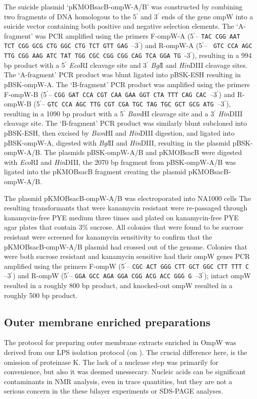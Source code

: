 The suicide plasmid `pKMOBsacB-ompW-A/B' was constructed by combining two fragments of DNA homologous to the 5$^\prime$ and 3$^\prime$ ends of the gene ompW into a suicide vector containing both positive and negative selection elements. The `A-fragment' was \ac{PCR} amplified using the primers F-ompW-A (5$^\prime$\!-- \texttt{TAC CGG AAT TCT CGG GCG CTG GGC CTG TCT GTT GAG }--3$^\prime$) and R-ompW-A (5$^\prime$\!-- \texttt{ GTC CCA AGC TTG CGG AAG ATC TAT TGG CGC CGG CGG CAG TCA GGA TG }-3$^\prime$), resulting in a 994 bp product with a 5$^\prime$ \textit{Eco}RI cleavage site and  3$^\prime$ \textit{Bgl}I and \textit{Hin}DIII cleavage sites.  The `A-fragment' \ac{PCR} product was blunt ligated into pBSK-ESH resulting in pBSK-ompW-A. The `B-fragment' PCR product was amplified using the primers F-ompW-B (5$^\prime$\!-- \texttt{CGG GAT CCA CGT CAA GAA GGT CTA TTT CAG CAC }--3$^\prime$) and R-ompW-B (5$^\prime$\!-- \texttt{GTC CCA AGC TTG CGT CGA TGC TAG TGC GCT GCG ATG }--3$^\prime$), resulting in a 1090 bp product with a 5$^\prime$ \textit{Bam}HI cleavage site and a 3$^\prime$ \textit{Hin}DIII cleavage site. The `B-fragment' \ac{PCR} product was similarly blunt subcloned into pBSK-ESH, then excised by \textit{Bam}HI and \textit{Hin}DIII digestion, and ligated into pBSK-ompW-A, digested with \textit{Bgl}II and \textit{Hin}DIII, resulting in the plasmid pBSK-ompW-A/B. The plasmids pBSK-ompW-A/B and pKMOBsacB were digested with \textit{Eco}RI and \textit{Hin}DIII, the 2070 bp fragment from pBSK-ompW-A/B was ligated into the pKMOBsacB fragment creating the plasmid pKMOBsacB-ompW-A/B.

The plasmid pKMOBsacB-ompW-A/B was electroporated into \caulobacter NA1000
cells The resulting transformants that
were kanamycin resistant were re-passaged through kanamycin-free \ac{PYE} medium
three times and plated on kanamycin-free \ac{PYE} agar plates that contain 3\%
sucrose. All colonies that were found to be sucrose resistant were screened for
kanamycin sensitivity to confirm that the pKMOBsacB-ompW-A/B plasmid had crossed
out of the genome. Colonies that were both sucrose resistant and kanamycin
sensitive had their ompW genes \ac{PCR} amplified using the primers F-ompW
(5$^\prime$\!-- \texttt{CGC ACT GGG CTT GCT GGC CTT TTT C }--3$^\prime$) and
R-ompW (5$^\prime$\!-- \texttt{GGA GCC AGA GGA CGG ACG ACC GGG G }--3$^\prime$); intact ompW resulted in a roughly 800 bp product, and knocked-out ompW resulted in a roughly 500 bp product.


\subsection{Outer membrane enriched preparations}
\label{sub:porin_omp_prep}
The protocol for preparing outer membrane extracts enriched in OmpW was derived from our \ac{LPS} isolation protocol (on ). The crucial difference here, is the omission of proteinase K. The lack of a nuclease step was primarily for convenience, but also it was deemed unessecary. Nucleic acids can be significant contaminants in \ac{NMR} analysis, even in trace quantities, but they are not a serious concern in the these bilayer  experiments or \ac{SDS-PAGE} analyses.

